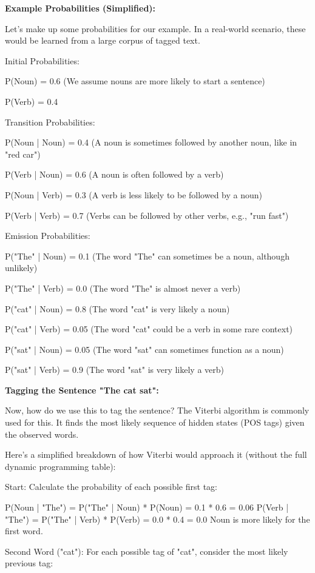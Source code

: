 \textbf{Example Probabilities (Simplified):}

Let's make up some probabilities for our example.  In a real-world scenario, these would be learned from a large corpus of tagged text.

Initial Probabilities:

P(Noun) = 0.6 (We assume nouns are more likely to start a sentence)

P(Verb) = 0.4

Transition Probabilities:

P(Noun | Noun) = 0.4 (A noun is sometimes followed by another noun, like in "red car")

P(Verb | Noun) = 0.6 (A noun is often followed by a verb)

P(Noun | Verb) = 0.3 (A verb is less likely to be followed by a noun)

P(Verb | Verb) = 0.7 (Verbs can be followed by other verbs, e.g., "run fast")

Emission Probabilities:

P("The" | Noun) = 0.1 (The word "The" can sometimes be a noun, although unlikely)

P("The" | Verb) = 0.0 (The word "The" is almost never a verb)

P("cat" | Noun) = 0.8 (The word "cat" is very likely a noun)

P("cat" | Verb) = 0.05 (The word "cat" could be a verb in some rare context)

P("sat" | Noun) = 0.05 (The word "sat" can sometimes function as a noun)

P("sat" | Verb) = 0.9 (The word "sat" is very likely a verb)

\textbf{Tagging the Sentence "The cat sat":}

Now, how do we use this to tag the sentence?  The Viterbi algorithm is commonly used for this.  It finds the most likely sequence of hidden states (POS tags) given the observed words.

Here's a simplified breakdown of how Viterbi would approach it (without the full dynamic programming table):

Start:  Calculate the probability of each possible first tag:

P(Noun | "The") = P("The" | Noun) * P(Noun) = 0.1 * 0.6 = 0.06
P(Verb | "The") = P("The" | Verb) * P(Verb) = 0.0 * 0.4 = 0.0
Noun is more likely for the first word.

Second Word ("cat"):  For each possible tag of "cat", consider the most likely previous tag:

